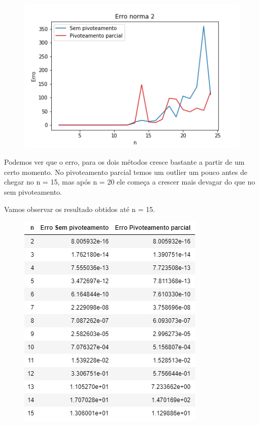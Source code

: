\documentclass{article}
\begin{document}
\begin{figure}[htb]
    \centering
    \includegraphics[scale=0.5]{image1.png}
    \label{fig:my_label}
\end{figure}

Podemos ver que o erro, para os dois métodos cresce bastante a partir de um certo momento. No pivoteamento parcial temos um outlier um pouco antes de chegar no n = 15, mas após n = 20 ele começa a crescer mais devagar do que no sem pivoteamento.
\par Vamos observar os resultado obtidos até n = 15.

\hfill

\begin{figure}[htb]
    \centering
    \includegraphics[scale=0.5]{Tabela 1.PNG}
    \label{fig:my_label}
\end{figure}
\end{document}

